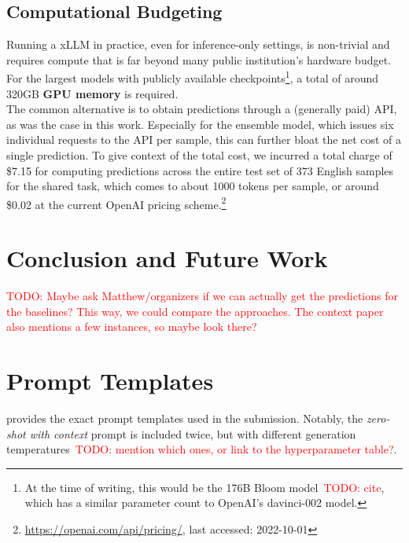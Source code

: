 \documentclass[11pt]{article}
\newcommand{\todo}[1]{\textcolor{red}{TODO: #1}}
\begin{document}
\subsection{Computational Budgeting}
Running a xLLM in practice, even for inference-only settings, is non-trivial and requires compute that is far beyond many public institution's hardware budget. For the largest models with publicly available checkpoints\footnote{At the time of writing, this would be the 176B Bloom model~\todo{cite}, which has a similar parameter count to OpenAI's davinci-002 model.}, a total of around 320GB \textbf{GPU memory} is required.\\
The common alternative is to obtain predictions through a (generally paid) API, as was the case in this work. Especially for the ensemble model, which issues six individual requests to the API per sample, this can further bloat the net cost of a single prediction.
To give context of the total cost, we incurred a total charge of \$7.15 for computing predictions across the entire test set of 373 English samples for the shared task, which comes to about 1000 tokens per sample, or around \$0.02 at the current OpenAI pricing scheme.\footnote{\url{https://openai.com/api/pricing/}, last accessed: 2022-10-01}


\section{Conclusion and Future Work}
\todo{Maybe ask Matthew/organizers if we can actually get the predictions for the baselines? This way, we could compare the approaches. The context paper also mentions a few instances, so maybe look there?}





\appendix

\section{Prompt Templates}
\label{sec:prompts}

 provides the exact prompt templates used in the submission. Notably, the \emph{zero-shot with context} prompt is included twice, but with different generation temperatures~\todo{mention which ones, or link to the hyperparameter table?}.
\end{document}
